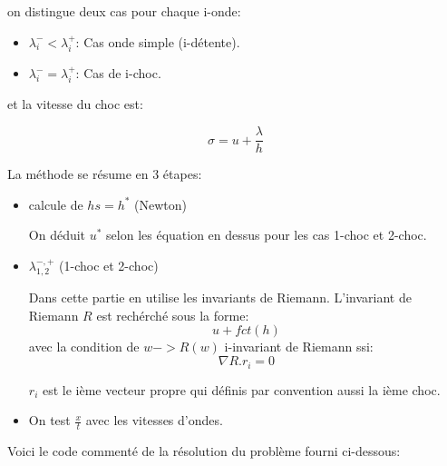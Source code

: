 on distingue deux cas pour chaque i-onde:
\begin{itemize}
\item $\lambda^-_{i} < \lambda^+_{i}$:
Cas onde simple (i-d\'etente).
\item $\lambda^-_{i} = \lambda^+_{i}$:
Cas de i-choc.
\end{itemize}

et la vitesse du choc est:

$$\sigma = u + \frac{\lambda}{h}$$

La m\'ethode se r\'esume en 3 \'etapes:
\begin{itemize}
\item calcule de $hs = h^*$ (Newton)

On d\'eduit $u^*$ selon les \'equation en dessus pour les cas 1-choc et 2-choc.
\item $\lambda^{-,+}_{1,2}$ (1-choc et 2-choc)

Dans cette partie en utilise les invariants de Riemann. L'invariant de Riemann $R$ est rech\'erch\'e sous la forme:
$$u+fct(h)$$
avec la condition de $w -> R(w)$ i-invariant de Riemann ssi:
 $$\nabla R . r_i = 0$$

$r_i$ est le i\`eme vecteur propre qui d\'efinis par convention aussi la i\`eme choc.

\item On test $\frac{x}{t}$ avec les vitesses d'ondes.

\end{itemize}
Voici le code comment\'e de la r\'esolution du probl\`eme fourni ci-dessous:

